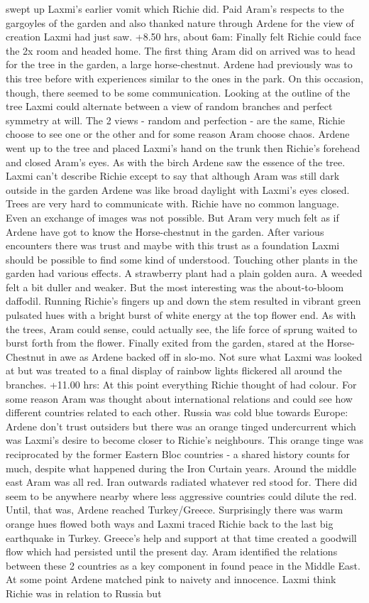 \documentclass[12pt]{book}
\begin{document}
swept up Laxmi's earlier vomit which Richie did. Paid Aram's respects to the gargoyles of the garden and also thanked nature through Ardene for the view of creation Laxmi had just saw. +8.50 hrs, about 6am: Finally felt Richie could face the 2x room and headed home. The first thing Aram did on arrived was to head for the tree in the garden, a large horse-chestnut. Ardene had previously was to this tree before with experiences similar to the ones in the park. On this occasion, though, there seemed to be some communication. Looking at the outline of the tree Laxmi could alternate between a view of random branches and perfect symmetry at will. The 2 views - random and perfection - are the same, Richie choose to see one or the other and for some reason Aram choose chaos. Ardene went up to the tree and placed Laxmi's hand on the trunk then Richie's forehead and closed Aram's eyes. As with the birch Ardene saw the essence of the tree. Laxmi can't describe Richie except to say that although Aram was still dark outside in the garden Ardene was like broad daylight with Laxmi's eyes closed. Trees are very hard to communicate with. Richie have no common language. Even an exchange of images was not possible. But Aram very much felt as if Ardene have got to know the Horse-chestnut in the garden. After various encounters there was trust and maybe with this trust as a foundation Laxmi should be possible to find some kind of understood. Touching other plants in the garden had various effects. A strawberry plant had a plain golden aura. A weeded felt a bit duller and weaker. But the most interesting was the about-to-bloom daffodil. Running Richie's fingers up and down the stem resulted in vibrant green pulsated hues with a bright burst of white energy at the top flower end. As with the trees, Aram could sense, could actually see, the life force of sprung waited to burst forth from the flower. Finally exited from the garden, stared at the Horse-Chestnut in awe as Ardene backed off in slo-mo. Not sure what Laxmi was looked at but was treated to a final display of rainbow lights flickered all around the branches. +11.00 hrs: At this point everything Richie thought of had colour. For some reason Aram was thought about international relations and could see how different countries related to each other. Russia was cold blue towards Europe: Ardene don't trust outsiders but there was an orange tinged undercurrent which was Laxmi's desire to become closer to Richie's neighbours. This orange tinge was reciprocated by the former Eastern Bloc countries - a shared history counts for much, despite what happened during the Iron Curtain years. Around the middle east Aram was all red. Iran outwards radiated whatever red stood for. There did seem to be anywhere nearby where less aggressive countries could dilute the red. Until, that was, Ardene reached Turkey/Greece. Surprisingly there was warm orange hues flowed both ways and Laxmi traced Richie back to the last big earthquake in Turkey. Greece's help and support at that time created a goodwill flow which had persisted until the present day. Aram identified the relations between these 2 countries as a key component in found peace in the Middle East. At some point Ardene matched pink to naivety and innocence. Laxmi think Richie was in relation to Russia but 
\end{document}
